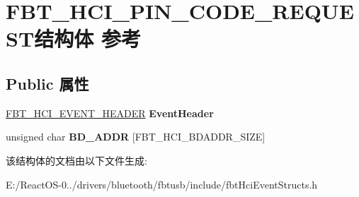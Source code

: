 \hypertarget{struct_f_b_t___h_c_i___p_i_n___c_o_d_e___r_e_q_u_e_s_t}{}\section{F\+B\+T\+\_\+\+H\+C\+I\+\_\+\+P\+I\+N\+\_\+\+C\+O\+D\+E\+\_\+\+R\+E\+Q\+U\+E\+S\+T结构体 参考}
\label{struct_f_b_t___h_c_i___p_i_n___c_o_d_e___r_e_q_u_e_s_t}
\subsection*{Public 属性}
\begin{DoxyCompactItemize}
\item 
\mbox{\label{struct_f_b_t___h_c_i___p_i_n___c_o_d_e___r_e_q_u_e_s_t_a2c539d325680e26dca90cfa8ab234f2d}} 
\hyperlink{struct_f_b_t___h_c_i___e_v_e_n_t___h_e_a_d_e_r}{F\+B\+T\+\_\+\+H\+C\+I\+\_\+\+E\+V\+E\+N\+T\+\_\+\+H\+E\+A\+D\+ER} {\bfseries Event\+Header}
\item 
\mbox{\label{struct_f_b_t___h_c_i___p_i_n___c_o_d_e___r_e_q_u_e_s_t_ac6fbf594549b90872b6b173aeb750c13}} 
unsigned char {\bfseries B\+D\+\_\+\+A\+D\+DR} \mbox{[}F\+B\+T\+\_\+\+H\+C\+I\+\_\+\+B\+D\+A\+D\+D\+R\+\_\+\+S\+I\+ZE\mbox{]}
\end{DoxyCompactItemize}


该结构体的文档由以下文件生成\+:\begin{DoxyCompactItemize}
\item 
E\+:/\+React\+O\+S-\/0../drivers/bluetooth/fbtusb/include/fbt\+Hci\+Event\+Structs.\+h\end{DoxyCompactItemize}
